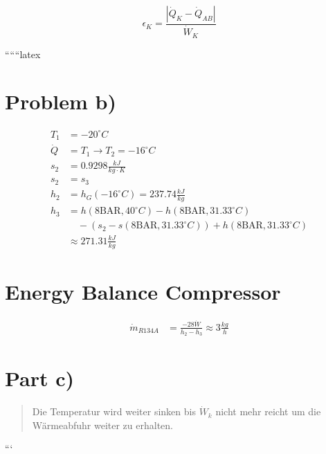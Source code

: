 \[
\epsilon_K = \frac{\left| \dot{Q}_K - \dot{Q}_{AB} \right|}{\dot{W}_K}
\]

``````latex


\section*{Problem b)}

\begin{align*}
    T_1 &= -20^\circ C \\
    \dot{Q} &= T_1 \rightarrow T_2 = -16^\circ C \\
    s_2 &= 0.9298 \frac{kJ}{kg \cdot K} \\
    s_2 &= s_3 \\
    h_2 &= h_G (-16^\circ C) = 237.74 \frac{kJ}{kg} \\
    h_3 &= h(8 \text{BAR}, 40^\circ C) - h(8 \text{BAR}, 31.33^\circ C) \\
    &\quad - (s_2 - s(8 \text{BAR}, 31.33^\circ C)) + h(8 \text{BAR}, 31.33^\circ C) \\
    &\approx 271.31 \frac{kJ}{kg}
\end{align*}

\section*{Energy Balance Compressor}

\begin{align*}
    \dot{m}_{R134A} &= \frac{-28 \dot{W}}{h_2 - h_3} \approx 3 \frac{kg}{h}
\end{align*}

\section*{Part c)}

\begin{quote}
    Die Temperatur wird weiter sinken bis $\dot{W}_k$ nicht mehr reicht um die Wärmeabfuhr weiter zu erhalten.
\end{quote}

```